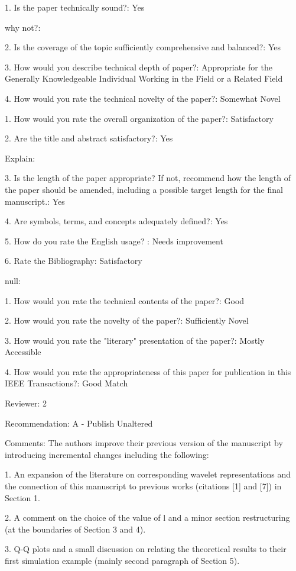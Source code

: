1. Is the paper technically sound?: Yes

why not?:

2. Is the coverage of the topic sufficiently comprehensive and balanced?: Yes

3. How would you describe technical depth of paper?: Appropriate for
the Generally Knowledgeable Individual Working in the Field or a
Related Field

4. How would you rate the technical novelty of the paper?: Somewhat Novel

1. How would you rate the overall organization of the paper?: Satisfactory

2. Are the title and abstract satisfactory?: Yes

Explain:

3. Is the length of the paper appropriate? If not, recommend how the
length of the paper should be amended, including a possible target
length for the final manuscript.: Yes

4. Are symbols, terms, and concepts adequately defined?: Yes

5. How do you rate the English usage? : Needs improvement

6. Rate the Bibliography: Satisfactory

null:

1. How would you rate the technical contents of the paper?: Good

2. How would you rate the novelty of the paper?: Sufficiently Novel

3. How would you rate the "literary" presentation of the paper?: Mostly Accessible

4. How would you rate the appropriateness of this paper for
publication in this IEEE Transactions?: Good Match


Reviewer: 2

Recommendation: A - Publish Unaltered

Comments: 
The authors improve their previous version of the manuscript
by introducing incremental changes including the following:

1. An expansion of the literature on corresponding wavelet
representations and the connection of this manuscript to previous
works (citations [1] and [7]) in Section 1.

2. A comment on the choice of the value of l and a minor section
restructuring (at the boundaries of Section 3 and 4).

3. Q-Q plots and a small discussion on relating the theoretical
results to their first simulation example (mainly second paragraph of
Section 5).

